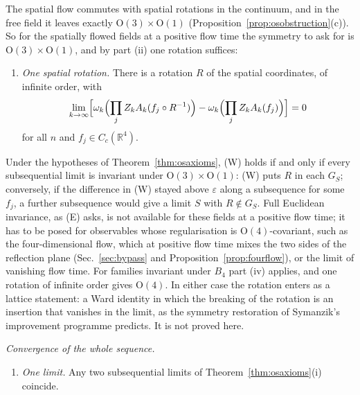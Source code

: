 \documentclass[aps,prd,twocolumn,superscriptaddress,nofootinbib,longbibliography,floatfix,amsmath,amssymb,10pt]{revtex4-2}
\theoremstyle{definition}
\theoremstyle{remark}
\newcommand{\R}{\mathbb{R}}
\begin{document}
The spatial flow commutes with spatial rotations in the continuum, and in
the free field it leaves exactly $\mathrm O(3)\times\mathrm O(1)$
(Proposition~\ref{prop:osobstruction}(c)). So for the spatially flowed
fields at a positive flow time the symmetry to ask for is
$\mathrm O(3)\times\mathrm O(1)$, and by part (ii) one rotation suffices:
\begin{enumerate}[label=\textup{(W)},leftmargin=*]
\item \emph{One spatial rotation.} There is a rotation $R$ of the spatial
coordinates, of infinite order, with
\[
\lim_{k\to\infty}\Bigl[\omega_k\Bigl(\prod_jZ_kA_k(f_j\circ R^{-1})\Bigr)
-\omega_k\Bigl(\prod_jZ_kA_k(f_j)\Bigr)\Bigr]=0
\]
for all $n$ and $f_j\in C_c(\R^4)$.
\end{enumerate}
Under the hypotheses of Theorem~\ref{thm:osaxioms}, (W) holds if and only
if every subsequential limit is invariant under $\mathrm O(3)\times\mathrm
O(1)$: (W) puts $R$ in each $G_S$; conversely, if the difference in (W) stayed
above $\varepsilon$ along a subsequence for some $f_j$, a further
subsequence would give a limit $S$ with $R\notin G_S$. Full Euclidean
invariance, as (E) asks, is not available for these fields at a positive
flow time; it has to be posed for observables whose regularisation is
$\mathrm O(4)$-covariant, such as the four-dimensional flow, which at
positive flow time mixes the two sides of the reflection plane
(Sec.~\ref{sec:bypass} and Proposition~\ref{prop:fourflow}), or the limit of vanishing flow time. For
families invariant under $B_4$ part (iv) applies, and one rotation of
infinite order gives $\mathrm O(4)$. In either case the rotation enters as a
lattice statement: a Ward identity in which the breaking of the rotation is
an insertion that vanishes in the limit, as the symmetry restoration of
Symanzik's improvement programme predicts. It is not proved here.

\emph{Convergence of the whole sequence.}
\begin{enumerate}[label=\textup{(U)},leftmargin=*]
\item \emph{One limit.} Any two subsequential limits of
Theorem~\ref{thm:osaxioms}(i) coincide.
\end{enumerate}
\end{document}
